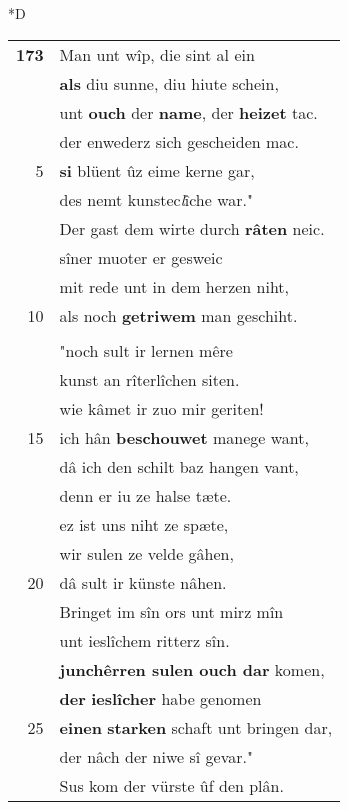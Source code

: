 \documentclass[8pt,a4paper,notitlepage]{article}
\begin{document}
\begin{table}[ht]
\begin{minipage}[t]{0.5\linewidth}
\small
\begin{center}*D
\end{center}
\begin{tabular}{rl}
\textbf{173} & Man unt wîp, die sint al ein\\ 
 & \textbf{als} diu sunne, diu hiute schein,\\ 
 & unt \textbf{ouch} der \textbf{name}, der \textbf{heizet} tac.\\ 
 & der enwederz sich gescheiden mac.\\ 
5 & \textbf{si} blüent ûz eime kerne gar,\\ 
 & des nemt kunstec\textit{l}îche war."\\ 
 & Der gast dem wirte durch \textbf{râten} neic.\\ 
 & sîner muoter er gesweic\\ 
 & mit rede unt in dem herzen niht,\\ 
10 & als noch \textbf{getriwem} man geschiht.\\ 
 & \textit{\begin{large}D\end{large}}er wirt sprach sîn êre:\\ 
 & "noch sult ir lernen mêre\\ 
 & kunst an rîterlîchen siten.\\ 
 & wie kâmet ir zuo mir geriten!\\ 
15 & ich hân \textbf{beschouwet} manege want,\\ 
 & dâ ich den schilt baz hangen vant,\\ 
 & denn er iu ze halse tæte.\\ 
 & ez ist uns niht ze spæte,\\ 
 & wir sulen ze velde gâhen,\\ 
20 & dâ sult ir künste nâhen.\\ 
 & Bringet im sîn ors unt mirz mîn\\ 
 & unt ieslîchem ritterz sîn.\\ 
 & \textbf{junchêrren sulen ouch dar} komen,\\ 
 & \textbf{der} \textbf{ieslîcher} habe genomen\\ 
25 & \textbf{einen} \textbf{starken} schaft unt bringen dar,\\ 
 & der nâch der niwe sî gevar."\\ 
 & Sus kom der vürste ûf den plân.\\ 

\end{tabular}
\end{minipage}
\end{table}
\end{document}
